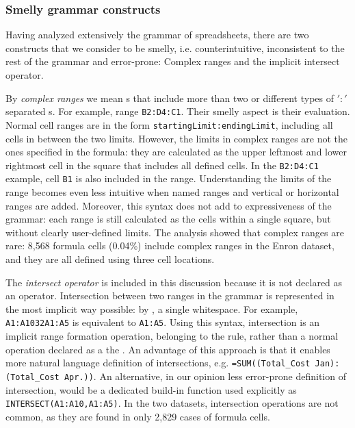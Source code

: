 \documentclass[conference]{IEEEtran}
\begin{document}
\subsubsection{Smelly grammar constructs}
Having analyzed extensively the grammar of spreadsheets, there are two constructs that we consider to be smelly, i.e. counterintuitive, inconsistent to the rest of the grammar and error-prone: Complex ranges and the implicit intersect operator.

By \textit{complex ranges} we mean s that include more than two or different types of $':'$ separated s. For example, range \texttt{B2:D4:C1}. Their smelly aspect is their evaluation. Normal cell ranges are in the form \texttt{startingLimit:endingLimit}, including all cells in between the two limits. However, the limits in complex ranges are not the ones specified in the formula: they are calculated as the upper leftmost and lower rightmost cell in the square that includes all defined cells. In the \texttt{B2:D4:C1} example, cell \texttt{B1} is also included in the range. Understanding the limits of the range becomes even less intuitive when named ranges and vertical or horizontal ranges are added. Moreover, this syntax does not add to expressiveness of the grammar: each range is still calculated as the cells within a single square, but without clearly user-defined limits. The analysis showed that complex ranges are rare: 8,568 formula cells	(0.04\%) include complex ranges in the Enron dataset, and they are all defined using three cell locations. 

The \textit{intersect operator} is included in this discussion because it is not declared as an operator. Intersection between two ranges in the grammar is represented in the most implicit way possible: by \texttt{}, a single whitespace. For example, \texttt{A1:A10\char32A1:A5} is equivalent to \texttt{A1:A5}. Using this syntax, intersection is an implicit range formation operation, belonging to the  rule, rather than a normal operation declared as a the . An advantage of this approach is that it enables more natural language definition of intersections, e.g.  \texttt{=SUM((Total_Cost Jan):(Total_Cost Apr.))}. An alternative, in our opinion less error-prone definition of intersection, would be a dedicated build-in function used explicitly as \texttt{INTERSECT(A1:A10,A1:A5)}. In the two datasets, intersection operations are not common, as they are found in only 2,829 cases of formula cells.
\end{document}
